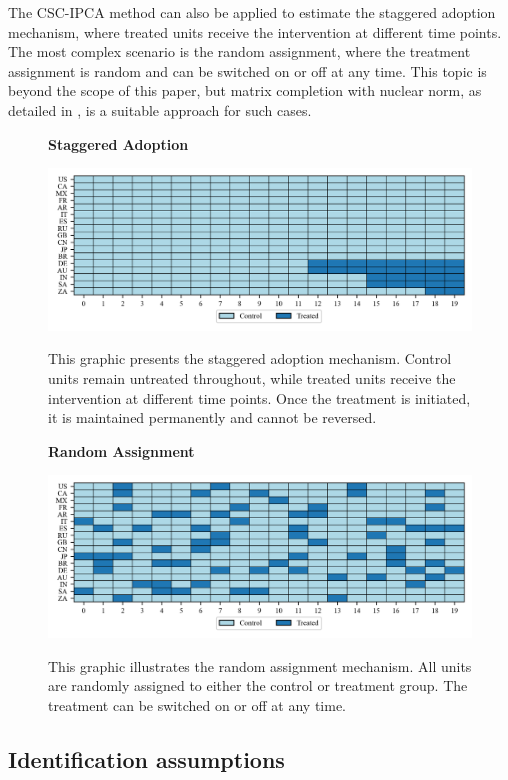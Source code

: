 \documentclass[12pt]{article}
\begin{document}
The CSC-IPCA method can also be applied to estimate the staggered adoption mechanism, where treated units receive the intervention at different time points. The most complex scenario is the random assignment, where the treatment assignment is random and can be switched on or off at any time. This topic is beyond the scope of this paper, but matrix completion with nuclear norm, as detailed in \cite{athey2021matrix}, is a suitable approach for such cases.

\begin{figure}[!ht]
\centering
\caption{\textbf{Staggered Adoption}}
\includegraphics{figs/staggered_adoption.png}
\label{app: staggered adoption}
\caption*{\footnotesize{This graphic presents the staggered adoption mechanism. Control units remain untreated throughout, while treated units receive the intervention at different time points. Once the treatment is initiated, it is maintained permanently and cannot be reversed.}}
\end{figure}

\begin{figure}[!ht]
\centering
\caption{\textbf{Random Assignment}}
\includegraphics{figs/random_assignment.png}
\label{app: random assignment}
\caption*{\footnotesize{This graphic illustrates the random assignment mechanism. All units are randomly assigned to either the control or treatment group. The treatment can be switched on or off at any time.}}
\end{figure}

\subsection{Identification assumptions}
\end{document}
